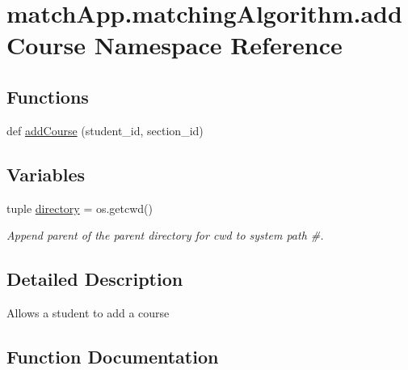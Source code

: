 \hypertarget{namespacematch_app_1_1matching_algorithm_1_1add_course}{}\section{match\+App.\+matching\+Algorithm.\+add\+Course Namespace Reference}
\label{namespacematch_app_1_1matching_algorithm_1_1add_course}
\subsection*{Functions}
\begin{DoxyCompactItemize}
\item 
def \hyperlink{namespacematch_app_1_1matching_algorithm_1_1add_course_ae931314b031acb961c8d3f2fa6c4b338}{add\+Course} (student\+\_\+id, section\+\_\+id)
\end{DoxyCompactItemize}
\subsection*{Variables}
\begin{DoxyCompactItemize}
\item 
tuple \hyperlink{namespacematch_app_1_1matching_algorithm_1_1add_course_a6e7c3f074c5f1319de59da69820f345d}{directory} = os.\+getcwd()
\begin{DoxyCompactList}\small\item\em Append parent of the parent directory for cwd to system path \#. \end{DoxyCompactList}\end{DoxyCompactItemize}


\subsection{Detailed Description}
\begin{DoxyVerb}Allows a student to add a course \end{DoxyVerb}
 

\subsection{Function Documentation}
\hypertarget{namespacematch_app_1_1matching_algorithm_1_1add_course_ae931314b031acb961c8d3f2fa6c4b338}{}
